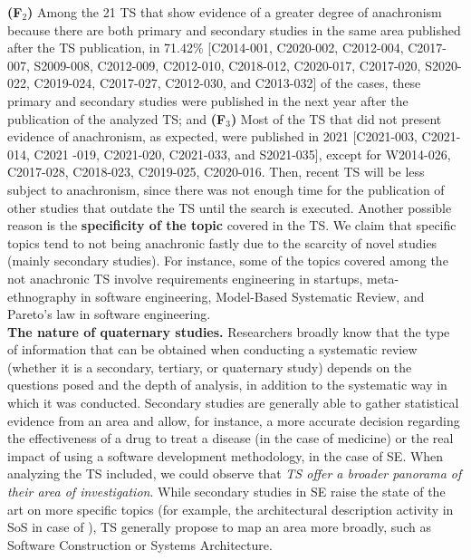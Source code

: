 \documentclass[sigconf]{acmart}
\begin{document}
\textbf{(F$_2$)} Among the 21 TS that show evidence of a greater degree of anachronism because there are both primary and secondary studies in the same area published after the TS publication, in 71.42\% [C2014-001, C2020-002, C2012-004, C2017-007, S2009-008, C2012-009, C2012-010, C2018-012, C2020-017, C2017-020, S2020-022, C2019-024, C2017-027, C2012-030, and C2013-032] of the cases, these primary and secondary studies were published in the next year after the publication of the analyzed TS; and \textbf{(F$_3$)} Most of the TS that did not present evidence of anachronism, as expected, were published in 2021 [C2021-003, C2021-014, C2021 -019, C2021-020, C2021-033, and S2021-035], except for W2014-026, C2017-028, C2018-023, C2019-025, C2020-016. Then, recent TS will be less subject to anachronism, since there was not enough time for the publication of other studies that outdate the TS until the search is executed. Another possible reason is the \textbf{specificity of the topic} covered in the TS. We claim that specific topics tend to not being anachronic fastly due to the scarcity of novel studies (mainly secondary studies). For instance, some of the topics covered among the not anachronic TS involve requirements engineering in startups, meta-ethnography in software engineering, Model-Based Systematic Review, and Pareto's law in software engineering.
\\
\noindent\textbf{The nature of quaternary studies.} %
Researchers broadly know that the type of information that can be obtained when conducting a systematic review (whether it is a secondary, tertiary, or quaternary study) depends on the questions posed and the depth of analysis, in addition to the systematic way in which it was conducted. %
Secondary studies are generally able to gather statistical evidence from an area and allow, for instance, a more accurate decision regarding the effectiveness of a drug to treat a disease (in the case of medicine) or the real impact of using a software development methodology, in the case of SE. %
When analyzing the TS included, we could observe that \textit{TS offer a broader panorama of their area of investigation}. While secondary studies in SE raise the state of the art on more specific topics (for example, the architectural description activity in SoS in case of \cite{Cadavid2020}), TS generally propose to map an area more broadly, such as Software Construction or Systems Architecture.
\end{document}
